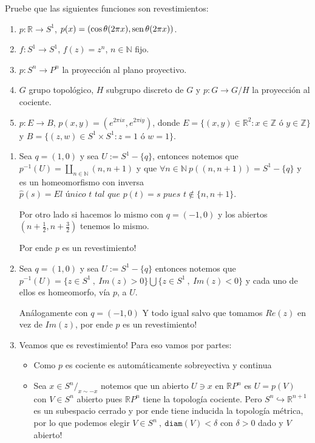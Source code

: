 \documentclass[11pt]{article}
\newcommand{\R}{{\mathbb{R}}}
\newcommand{\N}{{\mathbb{N}}}
\newenvironment{proof}[1][Demostraci\'on]{\begin{trivlist}
\item[\hskip \labelsep {\bfseries #1}]}{\end{trivlist}}
\newcommand{\Z}{\mathbb{Z}}
\newcommand{\inc}{\hookrightarrow}
\def\sen{{\rm sen} \, \theta}
\def\cos{{\rm cos}\, \theta}
\begin{document}
\begin{enumerate}
\item {Pruebe que las siguientes funciones son revestimientos:
	\begin{enumerate}
	\item $p : \R\to S^1$, $p(x)=(\cos(2\pi x), \sen(2\pi x))$.
	\item $f:S^1\to S^1$, $f(z)=z^n$,  $n\in\N$ fijo.
	\item $p:S^n\to P^n$ la proyecci\'on al plano proyectivo.
	\item $G$ grupo topol\'ogico, $H$ subgrupo discreto de $G$ y $p:G\to G/H$ la proyecci\'on al cociente.
	\item $p:E\to B$, $p(x,y)=(e^{2\pi i x}, e^{2\pi iy})$, donde 
$E = \{(x,y) \in \R^2 : x \in\Z \text{ \'o } y\in\Z\}$ y
$B = \{(z,w) \in S^1\times S^1 : z =1 \text{ \'o } w =1\}$.
	\end{enumerate}}

\begin{proof}

\begin{enumerate}

\item Sea $q = (1,0)$ y sea $U := S^1 - \{q\}$, entonces notemos que $p^{-1}(U) = \coprod_{n \in \N}{(n,n+1)}$ y que $\forall n \in \N \ p((n,n+1)) = S^1 - \{q\}$ y es un homeomorfismo con inversa $\hat{p}(s) = \textit{El \'unico t tal que $p(t)=s$ pues $t \not \in \{n,n+1\}$}$.

Por otro lado si hacemos lo mismo con $q = (-1,0) $ y los abiertos $(n + \frac{1}{2} , n + \frac{3}{2})$ tenemos lo mismo.

Por ende $p$ es un revestimiento!

\item Sea $q = (1,0)$ y sea $U:= S^1 - \{q\}$ entonces notemos que $p^{-1}(U)= \{z \in S^1 \ , \ Im(z)>0\} \bigcup \{z \in S^1 \ , \ Im(z)< 0\}$ y cada uno de ellos es homeomorfo, v\'ia $p$, a $U$.

An\'alogamente con $q = (-1,0)$ Y todo igual salvo que tomamos $Re(z)$ en vez de $Im(z)$, por ende $p$ es un revestimiento!

\item Veamos que es revestimiento! Para eso vamos por partes:

\begin{itemize}

\item Como $p$ es cociente es autom\'aticamente sobreyectiva y continua

\item Sea $x \in S^n /_{ \mathord x \sim -x}$ notemos que un abierto $ U \ni x$ en $\R P^n$ es $U=p(V)$ con $V \in S^n$ abierto pues $\R P^n$ tiene la topolog\'ia cociente. Pero $S^n \inc \R^{n+1}$ es un subespacio cerrado y por ende tiene inducida la topolog\'ia m\'etrica, por lo que podemos elegir $V \in S^n \ , \ \mathtt{diam}(V)< \delta$ con $\delta>0$ dado y $V$ abierto! 


\end{itemize}
\end{enumerate}
\end{proof}
\end{enumerate}
\end{document}
